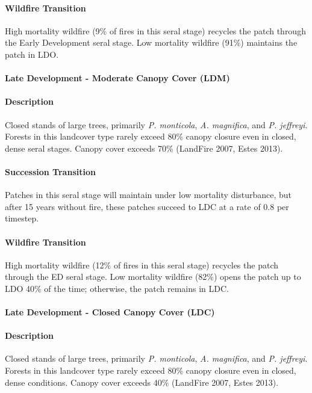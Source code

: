 \paragraph*{Wildfire Transition} High mortality wildfire (9\% of fires in this seral stage) recycles the patch through the Early Development seral stage. Low mortality wildfire (91\%) maintains the patch in LDO.

\noindent\hrulefill

\paragraph*{Late Development - Moderate Canopy Cover (LDM)}

\paragraph*{Description} Closed stands of large trees, primarily \emph{P. monticola}, \emph{A. magnifica}, and \emph{P. jeffreyi}. Forests in this landcover type rarely exceed 80\% canopy closure even in closed, dense seral stages. Canopy cover exceeds 70\% (LandFire 2007, Estes 2013).

\paragraph*{Succession Transition} Patches in this seral stage will maintain under low mortality disturbance, but after 15 years without fire, these patches succeed to LDC at a rate of 0.8 per timestep.

\paragraph*{Wildfire Transition} High mortality wildfire (12\% of fires in this seral stage) recycles the patch through the ED seral stage. Low mortality wildfire (82\%) opens the patch up to LDO 40\% of the time; otherwise, the patch remains in LDC.

\noindent\hrulefill

\paragraph*{Late Development - Closed Canopy Cover (LDC)}

\paragraph*{Description} Closed stands of large trees, primarily \emph{P. monticola}, \emph{A. magnifica}, and \emph{P. jeffreyi}. Forests in this landcover type rarely exceed 80\% canopy closure even in closed, dense conditions. Canopy cover exceeds 40\% (LandFire 2007, Estes 2013).

